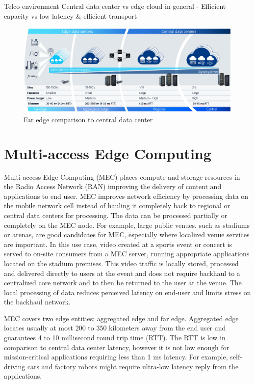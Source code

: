 Telco environment
Central data center vs edge cloud in general
    - Efficient capacity vs low latency \& efficient transport


\begin{figure}[ht]
  \begin{center}
    \includegraphics[width=13.5cm]{images/AirFrame.png}
    \caption{Far edge comparison to central data center \cite{AirFrameOpenEdgeServer}}
    \label{fig:AirFrame}
  \end{center}
\end{figure}

\section{Multi-access Edge Computing}

Multi-access Edge Computing (MEC) places compute and storage resources in the Radio Access Network (RAN) improving the delivery of content and applications to end user. MEC improves network efficiency by processing data on the mobile network cell instead of hauling it completely back to regional or central data centers for processing. The data can be processed partially or completely on the MEC node. For example, large public venues, such as stadiums or arenas, are good candidates for MEC, especially where localized venue services are important. In this use case, video created at a sports event or concert is served to on-site consumers from a MEC server, running appropriate applications located on the stadium premises. This video traffic is locally stored, processed and delivered directly to users at the event and does not require backhaul to a centralized core network and to then be returned to the user at the venue. The local processing of data reduces perceived latency on end-user and limits stress on the backhaul network. \cite{Brown2016}

MEC covers two edge entities: aggregated edge and far edge. Aggregated edge locates usually at most 200 to 350 kilometers away from the end user and guarantees 4 to 10 millisecond round trip time (RTT). The RTT is low in comparison to central data center latency, however it is not low enough for mission-critical applications requiring less than 1 ms latency. For example, self-driving cars and factory robots might require ultra-low latency reply from the applications.

